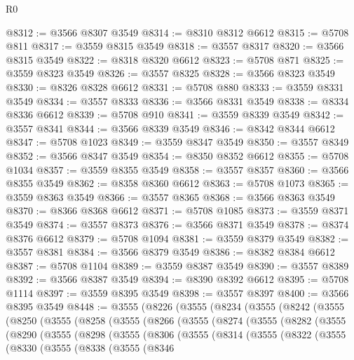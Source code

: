 \begin{lexlean}{R0}
\begin{coremodule}
@8312 := @3566 @8307 @3549
@8314 := @8310 @8312 @6612
@8315 := @5708 @811
@8317 := @3559 @8315 @3549
@8318 := @3557 @8317
@8320 := @3566 @8315 @3549
@8322 := @8318 @8320 @6612
@8323 := @5708 @871
@8325 := @3559 @8323 @3549
@8326 := @3557 @8325
@8328 := @3566 @8323 @3549
@8330 := @8326 @8328 @6612
@8331 := @5708 @880
@8333 := @3559 @8331 @3549
@8334 := @3557 @8333
@8336 := @3566 @8331 @3549
@8338 := @8334 @8336 @6612
@8339 := @5708 @910
@8341 := @3559 @8339 @3549
@8342 := @3557 @8341
@8344 := @3566 @8339 @3549
@8346 := @8342 @8344 @6612
@8347 := @5708 @1023
@8349 := @3559 @8347 @3549
@8350 := @3557 @8349
@8352 := @3566 @8347 @3549
@8354 := @8350 @8352 @6612
@8355 := @5708 @1034
@8357 := @3559 @8355 @3549
@8358 := @3557 @8357
@8360 := @3566 @8355 @3549
@8362 := @8358 @8360 @6612
@8363 := @5708 @1073
@8365 := @3559 @8363 @3549
@8366 := @3557 @8365
@8368 := @3566 @8363 @3549
@8370 := @8366 @8368 @6612
@8371 := @5708 @1085
@8373 := @3559 @8371 @3549
@8374 := @3557 @8373
@8376 := @3566 @8371 @3549
@8378 := @8374 @8376 @6612
@8379 := @5708 @1094
@8381 := @3559 @8379 @3549
@8382 := @3557 @8381
@8384 := @3566 @8379 @3549
@8386 := @8382 @8384 @6612
@8387 := @5708 @1104
@8389 := @3559 @8387 @3549
@8390 := @3557 @8389
@8392 := @3566 @8387 @3549
@8394 := @8390 @8392 @6612
@8395 := @5708 @1114
@8397 := @3559 @8395 @3549
@8398 := @3557 @8397
@8400 := @3566 @8395 @3549
@8448 := @3555
    (@8226
      (@3555
        (@8234
          (@3555
            (@8242
              (@3555
                (@8250
                  (@3555
                    (@8258
                      (@3555
                        (@8266
                          (@3555
                            (@8274
                              (@3555
                                (@8282
                                  (@3555
                                    (@8290
                                      (@3555
                                        (@8298
                                          (@3555
                                            (@8306
                                              (@3555
                                                (@8314
                                                  (@3555
                                                    (@8322
                                                      (@3555
                                                        (@8330
                                                          (@3555
                                                            (@8338
                                                              (@3555
                                                                (@8346

\end{coremodule}
\end{lexlean}
